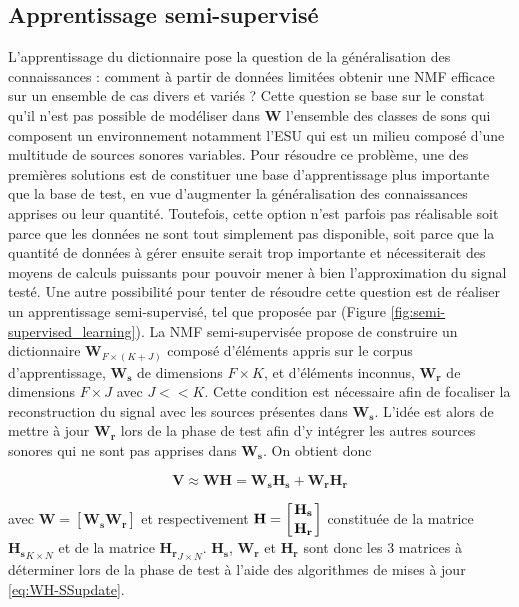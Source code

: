 \subsection{Apprentissage semi-supervisé}
L'apprentissage du dictionnaire pose la question de la généralisation des connaissances : comment à partir de données limitées obtenir une NMF efficace sur un ensemble de cas divers et variés ?  Cette question se base sur le constat qu'il n'est pas possible de modéliser dans $\mathbf{W}$ l'ensemble des classes de sons qui composent un environnement notamment l'ESU qui est un milieu composé d'une multitude de sources sonores variables. Pour résoudre ce problème, une des premières solutions est de constituer une base d'apprentissage plus importante que la base de test, en vue d'augmenter la généralisation des connaissances apprises ou leur quantité. Toutefois, cette option n'est parfois pas réalisable soit parce que les données ne sont tout simplement pas disponible, soit parce que la quantité de données à gérer ensuite serait trop importante et nécessiterait des moyens de calculs puissants pour pouvoir mener à bien l'approximation du signal testé.
Une autre possibilité pour tenter de résoudre cette question est de réaliser un apprentissage semi-supervisé, tel que proposée par \cite{lee_semi-supervised_2010, smaragdis2007supervised} (Figure \ref{fig:semi-supervised_learning}). La NMF semi-supervisée propose de construire un dictionnaire $\mathbf{W}_{F \times (K+J)}$ composé d'éléments appris sur le corpus d'apprentissage, $\mathbf{W_s} $ de dimensions $F \times K$, et d'éléments inconnus, $\mathbf{W_r}$ de dimensions $F \times J$ avec $J << K$. Cette condition est nécessaire afin de focaliser la reconstruction du signal avec les sources présentes dans $\mathbf{W_s}$. L'idée est alors de mettre à jour $\mathbf{W_r}$ lors de la phase de test afin d'y intégrer les autres sources sonores qui ne sont pas apprises dans $\mathbf{W_s}$. On obtient donc

\begin{equation}
\mathbf{V} \approx \mathbf{WH} = \mathbf{W_s} \mathbf{H_s} + \mathbf{W_r} \mathbf{H_r}
\end{equation}


avec $\mathbf{W} = \left[ \mathbf{W_s} \mathbf{W_r} \right]$ et respectivement $\mathbf{H} = \left[ \genfrac{}{}{0pt}{0}{\mathbf{H_s}}{\mathbf{H_r}} \right]$ constituée de la matrice $\mathbf{H_s}_{K \times N}$ et de la matrice $\mathbf{H_r}_{J \times N}$. $\mathbf{H_s}$, $\mathbf{W_r}$ et $\mathbf{H_r}$ sont donc les 3 matrices à déterminer lors de la phase de test à l'aide des algorithmes de mises à jour \ref{eq:WH-SSupdate}. 

